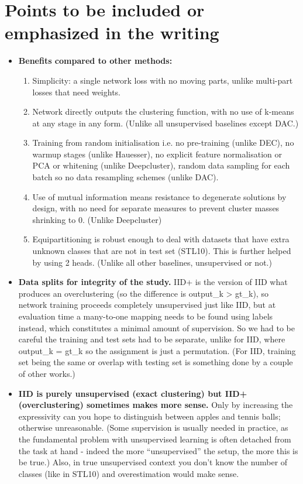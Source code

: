 \section{Points to be included or emphasized in the writing}
\begin{itemize}

\item \textbf{Benefits compared to other methods:}
\begin{enumerate}
\item Simplicity: a single network loss with no moving parts, unlike multi-part losses that need weights.
\item Network directly outputs the clustering function, with no use of k-means at any stage in any form. (Unlike all unsupervised baselines except DAC.)
\item Training from random initialisation i.e. no pre-training (unlike DEC), no warmup stages (unlike Hauesser), no explicit feature normalisation or PCA or whitening (unlike Deepcluster), random data sampling for each batch so no data resampling schemes (unlike DAC). 
\item Use of mutual information means resistance to degenerate solutions by design, with no need for separate measures to prevent cluster masses shrinking to 0. (Unlike Deepcluster)
\item Equipartitioning is robust enough to deal with datasets that have extra unknown classes that are not in test set (STL10). This is further helped by using 2 heads. (Unlike all other baselines, unsupervised or not.)
\end{enumerate}

\item \textbf{Data splits for integrity of the study.} IID+ is the version of IID what produces an overclustering (so the difference is output\_k > gt\_k), so network training proceeds completely unsupervised just like IID, but at evaluation time a many-to-one mapping needs to be found using labels instead, which constitutes a minimal amount of supervision. So we had to be careful the training and test sets had to be separate, unlike for IID, where output\_k = gt\_k so the assignment is just a permutation. (For IID, training set being the same or overlap with testing set is something done by a couple of other works.)

\item \textbf{IID is purely unsupervised (exact clustering) but IID+ (overclustering) sometimes makes more sense.} Only by increasing the expressivity can you hope to distinguish between apples and tennis balls; otherwise unreasonable. (Some supervision is usually needed in practice, as the fundamental problem with unsupervised learning is often detached from the task at hand - indeed the more “unsupervised” the setup, the more this is be true.) Also, in true unsupervised context you don't know the number of classes (like in STL10) and overestimation would make sense.


\end{itemize}
